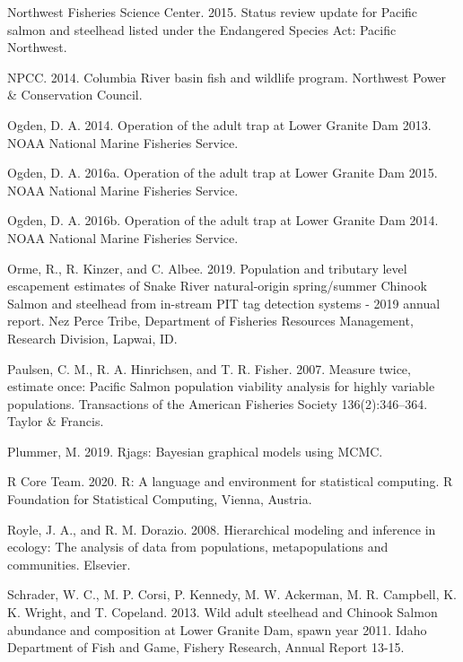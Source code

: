 \documentclass[
  12pt,
]{article}
\begin{document}
\leavevmode\hypertarget{ref-NWFSC2015}{}%
Northwest Fisheries Science Center. 2015. Status review update for Pacific salmon and steelhead listed under the Endangered Species Act: Pacific Northwest.

\leavevmode\hypertarget{ref-NPCC2014}{}%
NPCC. 2014. Columbia River basin fish and wildlife program. Northwest Power \& Conservation Council.

\leavevmode\hypertarget{ref-Ogden2014}{}%
Ogden, D. A. 2014. Operation of the adult trap at Lower Granite Dam 2013. NOAA National Marine Fisheries Service.

\leavevmode\hypertarget{ref-Ogden2016b}{}%
Ogden, D. A. 2016a. Operation of the adult trap at Lower Granite Dam 2015. NOAA National Marine Fisheries Service.

\leavevmode\hypertarget{ref-Ogden2016a}{}%
Ogden, D. A. 2016b. Operation of the adult trap at Lower Granite Dam 2014. NOAA National Marine Fisheries Service.

\leavevmode\hypertarget{ref-Orme2019}{}%
Orme, R., R. Kinzer, and C. Albee. 2019. Population and tributary level escapement estimates of Snake River natural-origin spring/summer Chinook Salmon and steelhead from in-stream PIT tag detection systems - 2019 annual report. Nez Perce Tribe, Department of Fisheries Resources Management, Research Division, Lapwai, ID.

\leavevmode\hypertarget{ref-Paulsen2007}{}%
Paulsen, C. M., R. A. Hinrichsen, and T. R. Fisher. 2007. Measure twice, estimate once: Pacific Salmon population viability analysis for highly variable populations. Transactions of the American Fisheries Society 136(2):346--364. Taylor \& Francis.

\leavevmode\hypertarget{ref-R-rjags}{}%
Plummer, M. 2019. Rjags: Bayesian graphical models using MCMC.

\leavevmode\hypertarget{ref-R-Core-Team2020}{}%
R Core Team. 2020. R: A language and environment for statistical computing. R Foundation for Statistical Computing, Vienna, Austria.

\leavevmode\hypertarget{ref-Royle2008}{}%
Royle, J. A., and R. M. Dorazio. 2008. Hierarchical modeling and inference in ecology: The analysis of data from populations, metapopulations and communities. Elsevier.

\leavevmode\hypertarget{ref-Schrader2013}{}%
Schrader, W. C., M. P. Corsi, P. Kennedy, M. W. Ackerman, M. R. Campbell, K. K. Wright, and T. Copeland. 2013. Wild adult steelhead and Chinook Salmon abundance and composition at Lower Granite Dam, spawn year 2011. Idaho Department of Fish and Game, Fishery Research, Annual Report 13-15.
\end{document}
